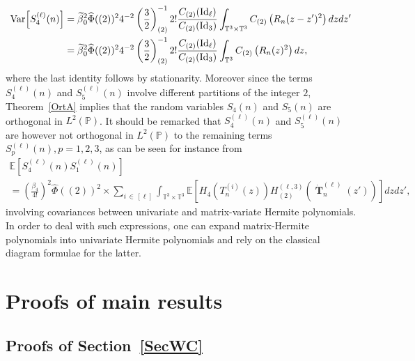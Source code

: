\documentclass[AHL,Unicode,longabstracts,published]{cedram}
\DeclareMathOperator{\Id}{Id}
\DeclareMathOperator{\bT}{\mathbf{T}}
\newcommand{\T}{\mathbb{T}^3}
\newcommand{\Prob}{\mathbb{P}}
\newcommand{\E}[1]{\mathbb{E}\left[#1\right]}
\newcommand{\V}[1]{\mathrm{Var}{\left[#1\right]}}
\let\oldtilde\tilde
\renewcommand*{\tilde}[1]{\mathchoice{\widetilde{#1}}{\widetilde{#1}}{\oldtilde{#1}}{\oldtilde{#1}}}
\begin{document}
\begin{align*}
\V{S_4^{(\ell)}(n)} &= \tilde{\beta}_0^2\widehat{\Phi}((2))^2 4^{-2}\left(\frac{3}{2}\right)_{(2)}^{-1} 2 ! \frac{C_{(2)}(\Id_{\ell})}{C_{(2)}(\Id_3)}
\int_{\T\times \T}C_{(2)}\left(R_n(z-z')^2\right)dzdz'\\
&=\tilde{\beta}_0^2\widehat{\Phi}((2))^2 4^{-2}\left(\frac{3}{2}\right)_{(2)}^{-1} 2 ! \frac{C_{(2)}(\Id_{\ell})}{C_{(2)}(\Id_3)}
\int_{\T }C_{(2)}\left(R_n(z)^2\right)dz,
\end{align*}
where the last identity follows by stationarity. Moreover since the terms $S_4^{(\ell)}(n)$ and $S_5^{(\ell)}(n)$ involve different partitions of the integer $2$, Theorem~\ref{OrtA} implies that the random variables $S_4(n)$ and $S_5(n)$ are orthogonal in $L^2(\Prob)$. It should be remarked that $S_4^{(\ell)}(n)$ and $S_5^{(\ell)}(n)$ are however not orthogonal in $L^2(\Prob)$ to the remaining terms $S_p^{(\ell)}(n), p=1,2,3$, as can be seen for instance from
\begin{multline*}
\E{S_4^{(\ell)}(n) S_1^{(\ell)}(n)}\\
=
\left(\frac{\beta_4}{4!}\right)^2 \widehat{\Phi}((2))^2 \times\sum_{i\,\in\,[\ell]} \int_{\T\times \T} \E{ H_4\left(T_n^{(i)}(z)\right) H_{(2)}^{(\ell,3)}\left(\dot{\bT}_n^{(\ell)}(z')\right) } dzdz',
\end{multline*}
involving covariances between univariate and matrix-variate Hermite polynomials. In order to deal with such expressions, one can expand matrix-Hermite polynomials into univariate Hermite polynomials and rely on the classical diagram formulae for the latter.



\section{Proofs of main results}\label{SecProofs}
\subsection{Proofs of Section~\ref{SecWC}}
\end{document}
